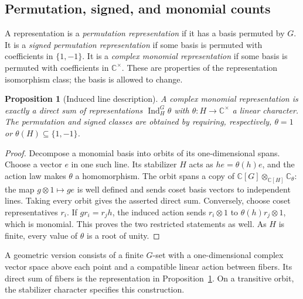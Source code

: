 \documentclass[11pt,a4paper]{article}
\newtheorem{proposition}{Proposition}[section]
\begin{document}
\subsection{Permutation, signed, and monomial counts}\label{subsec:A8}

A representation is a \emph{permutation representation} if it has a basis permuted by $G$. It is a \emph{signed permutation representation} if some basis is permuted with coefficients in $\{1,-1\}$. It is a \emph{complex monomial representation} if some basis is permuted with coefficients in $\mathbb C^\times$. These are properties of the representation isomorphism class; the basis is allowed to change.

\begin{proposition}[Induced line description]\label{l:monomial}
A complex monomial representation is exactly a direct sum of representations $\operatorname{Ind}_H^G\theta$ with $\theta:H\to\mathbb C^\times$ a linear character. The permutation and signed classes are obtained by requiring, respectively, $\theta=1$ or $\theta(H)\subseteq\{1,-1\}$.
\end{proposition}
\begin{proof}
Decompose a monomial basis into orbits of its one-dimensional spans. Choose a vector $e$ in one such line. Its stabilizer $H$ acts as $he=\theta(h)e$, and the action law makes $\theta$ a homomorphism. The orbit spans a copy of $\mathbb C[G]\otimes_{\mathbb C[H]}\mathbb C_\theta$: the map $g\otimes1\mapsto ge$ is well defined and sends coset basis vectors to independent lines. Taking every orbit gives the asserted direct sum. Conversely, choose coset representatives $r_i$. If $g r_i=r_jh$, the induced action sends $r_i\otimes1$ to $\theta(h)r_j\otimes1$, which is monomial. This proves the two restricted statements as well. As $H$ is finite, every value of $\theta$ is a root of unity.
\end{proof}

A geometric version consists of a finite $G$-set with a one-dimensional complex vector space above each point and a compatible linear action between fibers. Its direct sum of fibers is the representation in Proposition~\ref{l:monomial}. On a transitive orbit, the stabilizer character specifies this construction.
\end{document}

